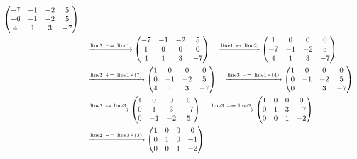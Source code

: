 \documentclass{ltjsarticle}
\begin{document}
\begin{align*}
\begin{pmatrix}
 - 7 & -1 & - 2 & 5\\
 - 6 & -1 & - 2 & 5\\
 4 & 1 & 3 & - 7
\end{pmatrix}\allowdisplaybreaks\\
&\ \ \ \xrightarrow{ \text{line} 2 \ -=\  \text{line} 1 } %
\begin{pmatrix}
 - 7 & -1 & - 2 & 5\\
 1 & 0 & 0 & 0\\
 4 & 1 & 3 & - 7
\end{pmatrix}\ \ \ \xrightarrow{ \text{line} 1 \ \leftrightarrow\  \text{line} 2 } %
\begin{pmatrix}
 1 & 0 & 0 & 0\\
 - 7 & -1 & - 2 & 5\\
 4 & 1 & 3 & - 7
\end{pmatrix}\allowdisplaybreaks\\
&\ \ \ \xrightarrow{ \text{line} 2 \ +=\  \text{line} 1 \times\left( 7 \right)} %
\begin{pmatrix}
 1 & 0 & 0 & 0\\
 0 & -1 & - 2 & 5\\
 4 & 1 & 3 & - 7
\end{pmatrix}
\ \ \ \xrightarrow{ \text{line} 3 \ -=\  \text{line} 1 \times\left( 4 \right)} %
\begin{pmatrix}
 1 & 0 & 0 & 0\\
 0 & -1 & - 2 & 5\\
 0 & 1 & 3 & - 7
\end{pmatrix}\allowdisplaybreaks\\
&\ \ \ \xrightarrow{ \text{line} 2 \ \leftrightarrow\  \text{line} 3 } %
\begin{pmatrix}
 1 & 0 & 0 & 0\\
 0 & 1 & 3 & - 7\\
 0 & -1 & - 2 & 5
\end{pmatrix}\ \ \ \xrightarrow{ \text{line} 3 \ +=\  \text{line} 2 } %
\begin{pmatrix}
 1 & 0 & 0 & 0\\
 0 & 1 & 3 & - 7\\
 0 & 0 & 1 & - 2
\end{pmatrix}\allowdisplaybreaks\\
&\ \ \ \xrightarrow{ \text{line} 2 \ -=\  \text{line} 3 \times\left( 3 \right)} %
\begin{pmatrix}
 1 & 0 & 0 & 0\\
 0 & 1 & 0 & -1\\
 0 & 0 & 1 & - 2
\end{pmatrix}
\end{align*}
\end{document}
